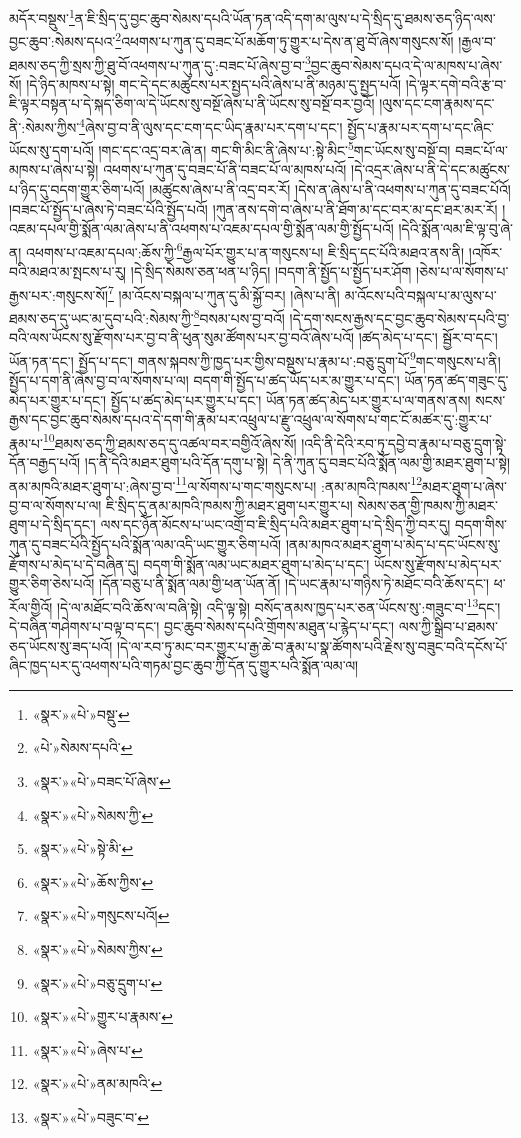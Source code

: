 མདོར་བསྡུས་\footnote{«སྣར་»«པེ་»བསྡུ་}ན་ཇི་སྲིད་དུ་བྱང་ཆུབ་སེམས་དཔའི་ཡོན་ཏན་འདི་དག་མ་ལུས་པ་དེ་སྲིད་དུ་ཐམས་ཅད་ཉིད་ལས་བྱང་ཆུབ་:སེམས་དཔའ་\footnote{«པེ་»སེམས་དཔའི་}འཕགས་པ་ཀུན་དུ་བཟང་པོ་མཆོག་ཏུ་གྱུར་པ་དེས་ན་ཐུ་བོ་ཞེས་གསུངས་སོ། །རྒྱལ་བ་ཐམས་ཅད་ཀྱི་སྲས་ཀྱི་ཐུ་བོ་འཕགས་པ་ཀུན་དུ་:བཟང་པོ་ཞེས་བྱ་བ་\footnote{«སྣར་»«པེ་»བཟང་པོ་ཞེས་}བྱང་ཆུབ་སེམས་དཔའ་དེ་ལ་མཁས་པ་ཞེས་སོ། །དེ་ཉིད་མཁས་པ་སྟེ། གང་དེ་དང་མཚུངས་པར་སྤྱད་པའི་ཞེས་པ་ནི་མཉམ་དུ་སྤྱད་པའོ། །དེ་ལྟར་དགེ་བའི་རྩ་བ་ཇི་ལྟར་བསྟན་པ་དེ་སྐད་ཅིག་ལ་དེ་ཡོངས་སུ་བསྔོ་ཞེས་པ་ནི་ཡོངས་སུ་བསྔོ་བར་བྱའོ། །ལུས་དང་ངག་རྣམས་དང་ནི་:སེམས་ཀྱིས་\footnote{«སྣར་»«པེ་»སེམས་ཀྱི་}ཞེས་བྱ་བ་ནི་ལུས་དང་ངག་དང་ཡིད་རྣམ་པར་དག་པ་དང་། སྤྱོད་པ་རྣམ་པར་དག་པ་དང་ཞིང་ཡོངས་སུ་དག་པའོ། །གང་དང་འདྲ་བར་ཞེ་ན། གང་གི་མིང་ནི་ཞེས་པ་:སྟེ་མིང་\footnote{«སྣར་»«པེ་»སྟེ་མི་}གང་ཡོངས་སུ་བསྔོ་བ། བཟང་པོ་ལ་མཁས་པ་ཞེས་པ་སྟེ། འཕགས་པ་ཀུན་དུ་བཟང་པོ་ནི་བཟང་པོ་ལ་མཁས་པའོ། །དེ་འདྲར་ཞེས་པ་ནི་དེ་དང་མཚུངས་པ་ཉིད་དུ་བདག་གྱུར་ཅིག་པའོ། །མཚུངས་ཞེས་པ་ནི་འདྲ་བར་རོ། །དེས་ན་ཞེས་པ་ནི་འཕགས་པ་ཀུན་དུ་བཟང་པོའོ། །བཟང་པོ་སྤྱོད་པ་ཞེས་ཏེ་བཟང་པོའི་སྤྱོད་པའོ། །ཀུན་ནས་དགེ་བ་ཞེས་པ་ནི་ཐོག་མ་དང་བར་མ་དང་ཐར་མར་རོ། །འཇམ་དཔལ་གྱི་སྨོན་ལམ་ཞེས་པ་ནི་འཕགས་པ་འཇམ་དཔལ་གྱི་སྨོན་ལམ་གྱི་སྤྱོད་པའོ། །དེའི་སྨོན་ལམ་ཇི་ལྟ་བུ་ཞེ་ན། འཕགས་པ་འཇམ་དཔལ་:ཆོས་ཀྱི་\footnote{«སྣར་»«པེ་»ཆོས་ཀྱིས་}རྒྱལ་པོར་གྱུར་པ་ན་གསུངས་པ། ཇི་སྲིད་དང་པོའི་མཐའ་ནས་ནི། །འཁོར་བའི་མཐའ་མ་སྤངས་པ་རུ། །དེ་སྲིད་སེམས་ཅན་ཕན་པ་ཉིད། །བདག་ནི་སྤྱོད་པ་སྤྱོད་པར་ཤོག །ཅེས་པ་ལ་སོགས་པ་རྒྱས་པར་:གསུངས་སོ།\footnote{«སྣར་»«པེ་»གསུངས་པའོ།} །མ་འོངས་བསྐལ་པ་ཀུན་དུ་མི་སྐྱོ་བར། །ཞེས་པ་ནི། མ་འོངས་པའི་བསྐལ་པ་མ་ལུས་པ་ཐམས་ཅད་དུ་ཡང་མ་དུབ་པའི་:སེམས་ཀྱི་\footnote{«སྣར་»«པེ་»སེམས་ཀྱིས་}བསམ་པས་བྱ་བའོ། །དེ་དག་སངས་རྒྱས་དང་བྱང་ཆུབ་སེམས་དཔའི་བྱ་བའི་ལས་ཡོངས་སུ་རྫོགས་པར་བྱ་བ་ནི་ཕུན་སུམ་ཚོགས་པར་བྱ་བའོ་ཞེས་པའོ། །ཚད་མེད་པ་དང་། སྦྱོར་བ་དང་། ཡོན་ཏན་དང་། སྤྱོད་པ་དང་། གནས་སྐབས་ཀྱི་ཁྱད་པར་གྱིས་བསྡུས་པ་རྣམ་པ་:བཅུ་དྲུག་པོ་\footnote{«སྣར་»«པེ་»བཅུ་དྲུག་པ་}གང་གསུངས་པ་ནི། སྤྱོད་པ་དག་ནི་ཞེས་བྱ་བ་ལ་སོགས་པ་ལ། བདག་གི་སྤྱོད་པ་ཚད་ཡོད་པར་མ་གྱུར་པ་དང་། ཡོན་ཏན་ཚད་གཟུང་དུ་མེད་པར་གྱུར་པ་དང་། སྤྱོད་པ་ཚད་མེད་པར་གྱུར་པ་དང་། ཡོན་ཏན་ཚད་མེད་པར་གྱུར་པ་ལ་གནས་ནས། སངས་རྒྱས་དང་བྱང་ཆུབ་སེམས་དཔའ་དེ་དག་གི་རྣམ་པར་འཕྲུལ་པ་རྫུ་འཕྲུལ་ལ་སོགས་པ་གང་ངོ་མཚར་དུ་:གྱུར་པ་རྣམ་པ་\footnote{«སྣར་»«པེ་»གྱུར་པ་རྣམས་}ཐམས་ཅད་ཀྱི་ཐམས་ཅད་དུ་འཚལ་བར་བགྱིའོ་ཞེས་སོ། །འདི་ནི་དེའི་རབ་ཏུ་དབྱེ་བ་རྣམ་པ་བཅུ་དྲུག་སྟེ་དོན་བརྒྱད་པའོ། །ད་ནི་དེའི་མཐར་ཐུག་པའི་དོན་དགུ་པ་སྟེ། དེ་ནི་ཀུན་དུ་བཟང་པོའི་སྨོན་ལམ་གྱི་མཐར་ཐུག་པ་སྟེ། ནམ་མཁའི་མཐར་ཐུག་པ་:ཞེས་བྱ་བ་\footnote{«སྣར་»«པེ་»ཞེས་པ་}ལ་སོགས་པ་གང་གསུངས་པ། :ནམ་མཁའི་ཁམས་\footnote{«སྣར་»«པེ་»ནམ་མཁའི་}མཐར་ཐུག་པ་ཞེས་བྱ་བ་ལ་སོགས་པ་ལ། ཇི་སྲིད་དུ་ནམ་མཁའི་ཁམས་ཀྱི་མཐར་ཐུག་པར་གྱུར་པ། སེམས་ཅན་གྱི་ཁམས་ཀྱི་མཐར་ཐུག་པ་དེ་སྲིད་དང་། ལས་དང་ཉོན་མོངས་པ་ཡང་འགྲོ་བ་ཇི་སྲིད་པའི་མཐར་ཐུག་པ་དེ་སྲིད་ཀྱི་བར་དུ། བདག་གིས་ཀུན་དུ་བཟང་པོའི་སྤྱོད་པའི་སྨོན་ལམ་འདི་ཡང་གྱུར་ཅིག་པའོ། །ནམ་མཁའ་མཐར་ཐུག་པ་མེད་པ་དང་ཡོངས་སུ་རྫོགས་པ་མེད་པ་དེ་བཞིན་དུ། བདག་གི་སྨོན་ལམ་ཡང་མཐར་ཐུག་པ་མེད་པ་དང་། ཡོངས་སུ་རྫོགས་པ་མེད་པར་གྱུར་ཅིག་ཅེས་པའོ། །དོན་བཅུ་པ་ནི་སྨོན་ལམ་གྱི་ཕན་ཡོན་ནོ། །དེ་ཡང་རྣམ་པ་གཉིས་ཏེ་མཐོང་བའི་ཆོས་དང་། ཕ་རོལ་གྱིའོ། །དེ་ལ་མཐོང་བའི་ཆོས་ལ་བཞི་སྟེ། འདི་ལྟ་སྟེ། བསོད་ནམས་ཁྱད་པར་ཅན་ཡོངས་སུ་:གཟུང་བ་\footnote{«སྣར་»«པེ་»བཟུང་བ་}དང་། དེ་བཞིན་གཤེགས་པ་བལྟ་བ་དང་། བྱང་ཆུབ་སེམས་དཔའི་གྲོགས་མཐུན་པ་རྙེད་པ་དང་། ལས་ཀྱི་སྒྲིབ་པ་ཐམས་ཅད་ཡོངས་སུ་ཟད་པའོ། །དེ་ལ་རབ་ཏུ་མང་བར་གྱུར་པ་རྒྱ་ཆེ་བ་རྣམ་པ་སྣ་ཚོགས་པའི་རྗེས་སུ་བཟུང་བའི་དངོས་པོ་ཞིང་ཁྱད་པར་དུ་འཕགས་པའི་གཏམ་བྱང་ཆུབ་ཀྱི་དོན་དུ་གྱུར་པའི་སྨོན་ལམ་ལ། 